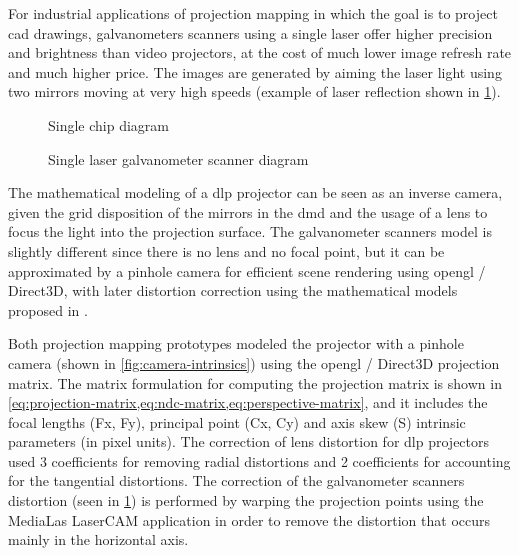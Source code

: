 For industrial applications of projection mapping in which the goal is to project \gls{cad} drawings, galvanometers scanners using a single laser offer higher precision and brightness than video projectors, at the cost of much lower image refresh rate and much higher price. The images are generated by aiming the laser light using two mirrors moving at very high speeds (example of laser reflection shown in \cref{fig:laser-projector-diagram-1-colors}).


\begin{figure}[H]
	\begin{floatrow}[2]
		{\caption[Single chip  diagram]{Single chip  diagram\protect\footnotemark}\label{fig:dlp-projector-diagram-1-dmd}}
		{\caption[Single laser galvanometer scanner diagram]{Single laser galvanometer scanner diagram\protect\footnotemark}\label{fig:laser-projector-diagram-1-colors}}
	\end{floatrow}
\end{figure}


The mathematical modeling of a \gls{dlp} projector can be seen as an inverse camera, given the grid disposition of the mirrors in the \gls{dmd} and the usage of a lens to focus the light into the projection surface. The galvanometer scanners model is slightly different since there is no lens and no focal point, but it can be approximated by a pinhole camera for efficient scene rendering using \gls{opengl} / Direct3D, with later distortion correction using the mathematical models proposed in \cite{Manakov2011}.

Both projection mapping prototypes modeled the projector with a pinhole camera \cite{Hartley2003} (shown in \cref{fig:camera-intrinsics}) using the \gls{opengl} / Direct3D projection matrix. The matrix formulation for computing the projection matrix is shown in \cref{eq:projection-matrix,eq:ndc-matrix,eq:perspective-matrix}, and it includes the focal lengths (Fx, Fy), principal point (Cx, Cy) and axis skew (S) intrinsic parameters (in pixel units). The correction of lens distortion for \gls{dlp} projectors used 3 coefficients for removing radial distortions and 2 coefficients for accounting for the tangential distortions. The correction of the galvanometer scanners distortion (seen in \cref{fig:laser-projector-diagram-1-colors}) is performed by warping the projection points using the MediaLas LaserCAM application in order to remove the distortion that occurs mainly in the horizontal axis.


